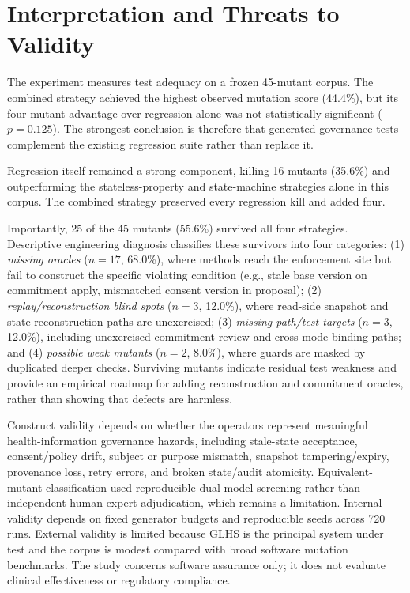 \documentclass[conference]{IEEEtran}
\begin{document}
\section{Interpretation and Threats to Validity}
The experiment measures test adequacy on a frozen 45-mutant corpus. The combined strategy achieved the highest observed mutation score (44.4\%), but its four-mutant advantage over regression alone was not statistically significant ($p = 0.125$). The strongest conclusion is therefore that generated governance tests complement the existing regression suite rather than replace it.

Regression itself remained a strong component, killing 16 mutants (35.6\%) and outperforming the stateless-property and state-machine strategies alone in this corpus. The combined strategy preserved every regression kill and added four.

Importantly, 25 of the 45 mutants (55.6\%) survived all four strategies. Descriptive engineering diagnosis classifies these survivors into four categories: (1) \emph{missing oracles} ($n=17$, 68.0\%), where methods reach the enforcement site but fail to construct the specific violating condition (e.g., stale base version on commitment apply, mismatched consent version in proposal); (2) \emph{replay/reconstruction blind spots} ($n=3$, 12.0\%), where read-side snapshot and state reconstruction paths are unexercised; (3) \emph{missing path/test targets} ($n=3$, 12.0\%), including unexercised commitment review and cross-mode binding paths; and (4) \emph{possible weak mutants} ($n=2$, 8.0\%), where guards are masked by duplicated deeper checks. Surviving mutants indicate residual test weakness and provide an empirical roadmap for adding reconstruction and commitment oracles, rather than showing that defects are harmless.

Construct validity depends on whether the operators represent meaningful health-information governance hazards, including stale-state acceptance, consent/policy drift, subject or purpose mismatch, snapshot tampering/expiry, provenance loss, retry errors, and broken state/audit atomicity. Equivalent-mutant classification used reproducible dual-model screening rather than independent human expert adjudication, which remains a limitation. Internal validity depends on fixed generator budgets and reproducible seeds across 720 runs. External validity is limited because GLHS is the principal system under test and the corpus is modest compared with broad software mutation benchmarks. The study concerns software assurance only; it does not evaluate clinical effectiveness or regulatory compliance.
\end{document}

